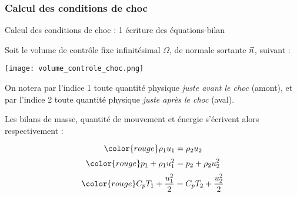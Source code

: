 \subsubsection{Calcul des conditions de choc}
\begin{frame}{Calcul des conditions de choc : 1 écriture des équations-bilan}

\small

Soit le volume de contrôle fixe infinitésimal $\Omega$, de normale sortante $\vec{n}$,
suivant :

\begin{center}
	\texttt{[image: volume\_controle\_choc.png]}
\end{center}

On notera par l'indice 1 toute quantité physique \textsl{juste avant le choc} (amont), et
 par l'indice 2 toute quantité physique \textsl{juste après le choc} (aval).

\vspace{5mm}

\pause 
Les bilans de masse, quantité de mouvement et énergie s'écrivent alors respectivement :

\begin{equation}
	\color{rouge}
	\rho_1 u_1 = \rho_2 u_2
\end{equation}
\begin{equation}
	\color{rouge}
	p_1 + \rho_1 u_1^2 = p_2+\rho_2 u_2^2
\end{equation}
\begin{equation}
	\color{rouge}
	C_p T_1 + \frac{u_1^2}{2} = C_p T_2 + \frac{u_2^2}{2}
\end{equation}

\end{frame}

